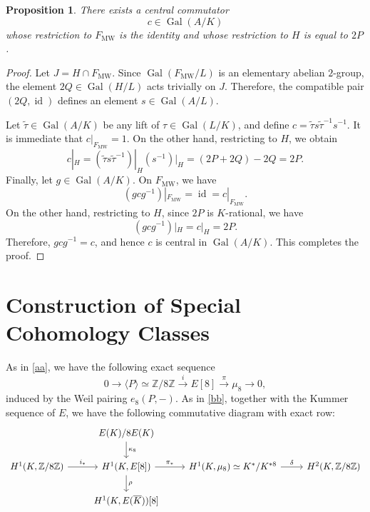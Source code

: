 \documentclass[11pt,a4paper]{amsart}
\newtheorem{proposition}[theorem]{Proposition}
\theoremstyle{definition}
\newcommand{\Gal}{\operatorname{Gal}}
\numberwithin{equation}{section}
\begin{document}
\begin{proposition}
	\label{lem:strong-commutator}
	There exists a central commutator
	\[
	c\in\Gal(A/K)
	\]
	whose restriction to $F_{\mathrm{MW}}$ is the identity and whose
	restriction to $H$ is equal to $2P$.
\end{proposition}

\begin{proof}
	Let	$J=H\cap F_{\mathrm{MW}}$. Since $\Gal(F_{\mathrm{MW}}/L)$ is an elementary abelian
	$2$-group, the element $2Q\in\Gal(H/L)$ acts trivially on $J$.
	Therefore, the compatible pair	$(2Q,\operatorname{id})$
	defines an element $ s\in\Gal(A/L)$.
	
	Let $\widetilde{\tau}\in\Gal(A/K)$	be any lift of $\tau\in\Gal(L/K)$, and define
$
	c=\widetilde{\tau}s\widetilde{\tau}^{-1}s^{-1}.
$
	It is immediate that $c|_{F_{\mathrm{MW}}}=1$.
	On the other hand, restricting to $H$, we obtain
	\[
	c|_H
	=
	(\widetilde{\tau}s\widetilde{\tau}^{-1})|_H(s^{-1})|_H
	=
	(2P+2Q)-2Q
	=
	2P.
	\]
Finally, let $g\in \Gal(A/K)$. On $F_{\mathrm{MW}}$, we have
\[
(gcg^{-1})|_{F_{\mathrm{MW}}}
=
\operatorname{id}
=
c|_{F_{\mathrm{MW}}}.
\]
On the other hand, restricting to $H$, since $2P$ is $K$-rational, we have
\[
(gcg^{-1})|_H=c|_H=2P.
\]
Therefore, $gcg^{-1}=c$, and hence $c$ is central in
$\Gal(A/K)$. This completes the proof.
\end{proof}



\section{Construction of Special Cohomology Classes}
As in \eqref{aa}, we have the following exact sequence
\[
0\longrightarrow \langle P\rangle\simeq \mathbb{Z}/8\mathbb{Z}
\xrightarrow{i} E[8]
\xrightarrow{\pi} \mu_8
\longrightarrow 0,
\tag{$\mathcal E$}\label{eq:torsion-extension}
\]
induced by the Weil pairing $e_8(P,-)$. As in \eqref{bb}, together
with the Kummer sequence of $E$, we have the following commutative
diagram with exact row:
\begin{equation}\label{dd}
	\begin{tikzcd}
		&E(K)/8E(K)\ar[d,"\kappa_8"]&&\\
		H^1(K,\mathbb{Z}/8\mathbb{Z})
		\ar[r,"i_*"]
		&H^1(K,E[8])
		\ar[r,"\pi_*"]
		\ar[d,"\rho"]
		&H^1(K,\mu_8)\simeq K^*/K^{*8}
		\ar[r,"\delta"]
		&H^2(K,\mathbb{Z}/8\mathbb{Z})\\
		&H^1(K,E(\overline{K}))[8]&&
	\end{tikzcd}
\end{equation}
\end{document}
